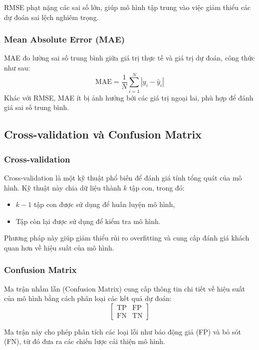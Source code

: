 RMSE phạt nặng các sai số lớn, giúp mô hình tập trung vào việc giảm thiểu các dự đoán sai lệch nghiêm trọng.

\subsubsection{Mean Absolute Error (MAE)}
MAE đo lường sai số trung bình giữa giá trị thực tế và giá trị dự đoán, công thức như sau:
\[
\text{MAE} = \frac{1}{N} \sum_{i=1}^N |y_i - \hat{y}_i|
\]
Khác với RMSE, MAE ít bị ảnh hưởng bởi các giá trị ngoại lai, phù hợp để đánh giá sai số trung bình.

\subsection{Cross-validation và Confusion Matrix}
\subsubsection{Cross-validation}
Cross-validation là một kỹ thuật phổ biến để đánh giá tính tổng quát của mô hình. Kỹ thuật này chia dữ liệu thành \(k\) tập con, trong đó:
\begin{itemize}
    \item \(k-1\) tập con được sử dụng để huấn luyện mô hình,
    \item Tập còn lại được sử dụng để kiểm tra mô hình.
\end{itemize}

Phương pháp này giúp giảm thiểu rủi ro overfitting và cung cấp đánh giá khách quan hơn về hiệu suất của mô hình.

\subsubsection{Confusion Matrix}
Ma trận nhầm lẫn (Confusion Matrix) cung cấp thông tin chi tiết về hiệu suất của mô hình bằng cách phân loại các kết quả dự đoán:
\[
\begin{bmatrix}
\text{TP} & \text{FP} \\
\text{FN} & \text{TN}
\end{bmatrix}
\]

Ma trận này cho phép phân tích các loại lỗi như báo động giả (FP) và bỏ sót (FN), từ đó đưa ra các chiến lược cải thiện mô hình.

